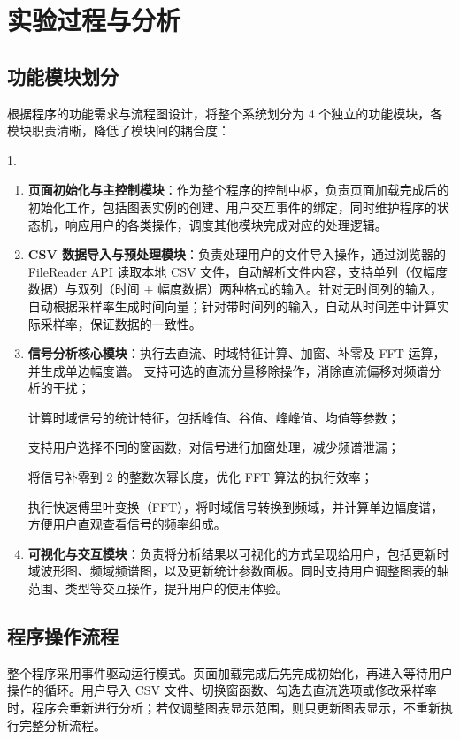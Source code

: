 \documentclass[11pt,a4paper]{ctexart}
\begin{document}
\section{实验过程与分析}

\subsection{功能模块划分}

根据程序的功能需求与流程图设计，将整个系统划分为 4 个独立的功能模块，各模块职责清晰，降低了模块间的耦合度：

1.

\begin{enumerate}
  \item \textbf{页面初始化与主控制模块}：作为整个程序的控制中枢，负责页面加载完成后的初始化工作，包括图表实例的创建、用户交互事件的绑定，同时维护程序的状态机，响应用户的各类操作，调度其他模块完成对应的处理逻辑。
  \item \textbf{CSV 数据导入与预处理模块}：负责处理用户的文件导入操作，通过浏览器的 FileReader API 读取本地 CSV 文件，自动解析文件内容，支持单列（仅幅度数据）与双列（时间 $ + $ 幅度数据）两种格式的输入。针对无时间列的输入，自动根据采样率生成时间向量；针对带时间列的输入，自动从时间差中计算实际采样率，保证数据的一致性。
  \item \textbf{信号分析核心模块}：执行去直流、时域特征计算、加窗、补零及 FFT 运算，并生成单边幅度谱。
  支持可选的直流分量移除操作，消除直流偏移对频谱分析的干扰；

  计算时域信号的统计特征，包括峰值、谷值、峰峰值、均值等参数；

  支持用户选择不同的窗函数，对信号进行加窗处理，减少频谱泄漏；

  将信号补零到 2 的整数次幂长度，优化 FFT 算法的执行效率；

  执行快速傅里叶变换（FFT），将时域信号转换到频域，并计算单边幅度谱，方便用户直观查看信号的频率组成。


  \item \textbf{可视化与交互模块}：负责将分析结果以可视化的方式呈现给用户，包括更新时域波形图、频域频谱图，以及更新统计参数面板。同时支持用户调整图表的轴范围、类型等交互操作，提升用户的使用体验。
\end{enumerate}

\subsection{程序操作流程}

整个程序采用事件驱动运行模式。页面加载完成后先完成初始化，再进入等待用户操作的循环。用户导入 CSV 文件、切换窗函数、勾选去直流选项或修改采样率时，程序会重新进行分析；若仅调整图表显示范围，则只更新图表显示，不重新执行完整分析流程。
\end{document}
